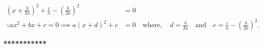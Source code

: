 \vspace{-10mm}

\begin{align*}
\left(x + \frac{b}{2a} \right)^{2} + \frac{c}{a} - \left(\frac{b}{2a}\right)^{2} &=0\\
\therefore ax^2+bx+c = 0 \implies a(x+d)^{2} + e &=0 \quad \text{where},\quad
d =\frac{b}{2a} \quad \text{and} \quad e = \frac{c}{a} - \left(\frac{b}{2a}\right)^{2}.
\end{align*}

\begin{center}
\textbf{***********}
\end{center}